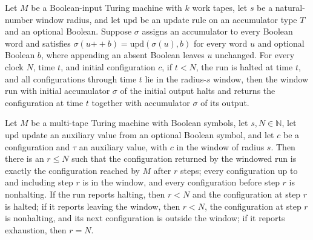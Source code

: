 \begin{theorem}
\label{Turing.windowRun_halted_of_run}
\leanok
{}
Let $M$ be a Boolean-input Turing machine with $k$ work tapes, let $s$ be a
natural-number window radius, and let $\mathrm{upd}$ be an update rule on an accumulator
type $T$ and an optional Boolean. Suppose $\sigma$ assigns an accumulator to every
Boolean word and satisfies $\sigma(u\mathbin{++}b)=\mathrm{upd}(\sigma(u),b)$ for every
word $u$ and optional Boolean $b$, where appending an absent Boolean leaves $u$
unchanged. For every clock $N$, time $t$, and initial configuration $c$, if $t<N$, the
run is halted at time $t$, and all configurations through time $t$ lie in the radius-$s$
window, then the window run with initial accumulator $\sigma$ of the initial output
halts and returns the configuration at time $t$ together with accumulator $\sigma$ of
its output.
\end{theorem}

\begin{theorem}
\label{Turing.windowRun_spec}
\leanok
{}
Let $M$ be a multi-tape Turing machine with Boolean symbols, let $s,N\in\mathbb{N}$, let
$\mathrm{upd}$ update an auxiliary value from an optional Boolean symbol, and let $c$ be
a configuration and $\tau$ an auxiliary value, with $c$ in the window of radius $s$.
Then there is an $r\le N$ such that the configuration returned by the windowed run is
exactly the configuration reached by $M$ after $r$ steps; every configuration up to and
including step $r$ is in the window, and every configuration before step $r$ is
nonhalting. If the run reports halting, then $r<N$ and the configuration at step $r$ is
halted; if it reports leaving the window, then $r<N$, the configuration at step $r$ is
nonhalting, and its next configuration is outside the window; if it reports exhaustion,
then $r=N$.
\end{theorem}

